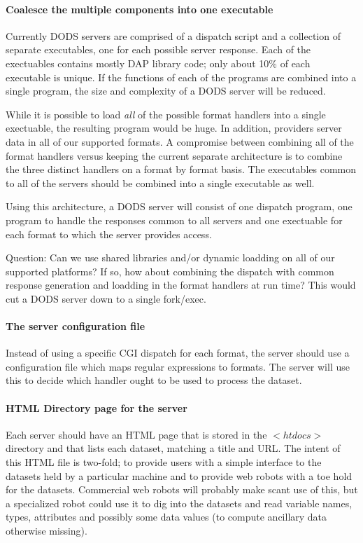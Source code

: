 \documentclass{article}
\begin{document}
\paragraph{Coalesce the multiple components into one executable}
Currently DODS servers are comprised of a dispatch script and a
collection of separate executables, one for each possible server
response. Each of the exectuables contains mostly DAP library code;
only about 10\% of each executable is unique. If the functions of each
of the programs are combined into a single program, the size and
complexity of a DODS server will be reduced. 

While it is possible to load \emph{all} of the possible format
handlers into a single exectuable, the resulting program would be
huge. In addition, providers server data in all of our supported
formats. A compromise between combining all of the format handlers
versus keeping the current separate architecture is to combine the
three distinct handlers on a format by format basis. The executables
common to all of the servers should be combined into a single
executable as well.

Using this architecture, a DODS server will consist of one dispatch
program, one program to handle the responses common to all servers and
one exectuable for each format to which the server provides access.

Question: Can we use shared libraries and/or dynamic loadding on all
of our supported platforms? If so, how about combining the dispatch
with common response generation and loadding in the format handlers at
run time? This would cut a DODS server down to a single fork/exec.

\paragraph{The server configuration file}
Instead of using a specific CGI dispatch for each format, the server
should use a configuration file which maps regular expressions to
formats. The server will use this to decide which handler ought to be
used to process the dataset. 

\paragraph{HTML Directory page for the server}
Each server should have an HTML page that is stored in the $<htdocs>$
directory and that lists each dataset, matching a title and URL. The
intent of this HTML file is two-fold; to provide users with a simple
interface to the datasets held by a particular machine and to provide
web robots with a toe hold for the datasets. Commercial web robots
will probably make scant use of this, but a specialized robot could
use it to dig into the datasets and read variable names, types,
attributes and possibly some data values (to compute ancillary data
otherwise missing).
\end{document}
